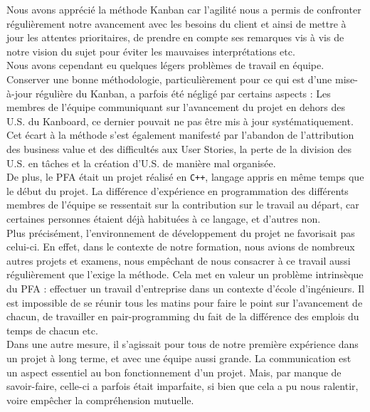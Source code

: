 Nous avons apprécié la méthode Kanban car l'agilité nous a permis de confronter régulièrement notre avancement avec les besoins du client et ainsi de mettre à jour les attentes prioritaires, de prendre en compte ses remarques vis à vis de notre vision du sujet pour éviter les mauvaises interprétations etc.\\



Nous avons cependant eu quelques légers problèmes de travail en équipe.\\

Conserver une bonne méthodologie, particulièrement pour ce qui est d'une mise-à-jour régulière du Kanban, a parfois été négligé par certains aspects : Les membres de l'équipe communiquant sur l'avancement du projet en dehors des U.S. du Kanboard, ce dernier pouvait ne pas être mis à jour systématiquement. Cet écart à la méthode s'est également manifesté par l'abandon de l'attribution des business value et des difficultés aux User Stories, la perte de la division des U.S. en tâches et la création d'U.S. de manière mal organisée.\\

De plus, le PFA était un projet réalisé en \texttt{C++}, langage appris en même temps que le début du projet. La différence d'expérience en programmation des différents membres de l'équipe se ressentait sur la contribution sur le travail au départ, car certaines personnes étaient déjà habituées à ce langage, et d'autres non.\\

Plus précisément, l'environnement de développement du projet ne favorisait pas celui-ci. En effet, dans le contexte de notre formation, nous avions de nombreux autres projets et examens, nous empêchant de nous consacrer à ce travail aussi régulièrement que l'exige la méthode. Cela met en valeur un problème intrinsèque du PFA : effectuer un travail d'entreprise dans un contexte d'école d'ingénieurs. Il est impossible de se réunir tous les matins pour faire le point sur l'avancement de chacun, de travailler en pair-programming du fait de la différence des emplois du temps de chacun etc.\\

Dans une autre mesure, il s'agissait pour tous de notre première expérience dans un projet à long terme, et avec une équipe aussi grande. La communication est un aspect essentiel au bon fonctionnement d'un projet. Mais, par manque de savoir-faire, celle-ci a parfois était imparfaite, si bien que cela a pu nous ralentir, voire empêcher la compréhension mutuelle. \\ 

